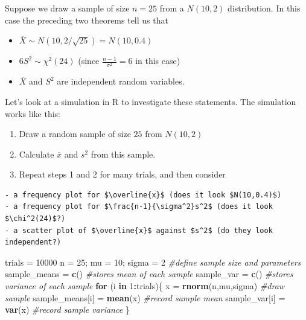 \documentclass[
]{book}
\newenvironment{Shaded}{\begin{snugshade}}{\end{snugshade}}
\newcommand{\CommentTok}[1]{\textcolor[rgb]{0.56,0.35,0.01}{\textit{#1}}}
\newcommand{\ControlFlowTok}[1]{\textcolor[rgb]{0.13,0.29,0.53}{\textbf{#1}}}
\newcommand{\DecValTok}[1]{\textcolor[rgb]{0.00,0.00,0.81}{#1}}
\newcommand{\FunctionTok}[1]{\textcolor[rgb]{0.13,0.29,0.53}{\textbf{#1}}}
\newcommand{\NormalTok}[1]{#1}
\newcommand{\OtherTok}[1]{\textcolor[rgb]{0.56,0.35,0.01}{#1}}
\newcommand{\SpecialCharTok}[1]{\textcolor[rgb]{0.81,0.36,0.00}{\textbf{#1}}}
\providecommand{\tightlist}{%
  \setlength{\itemsep}{0pt}\setlength{\parskip}{0pt}}
\theoremstyle{definition}
\theoremstyle{definition}
\theoremstyle{definition}
\theoremstyle{definition}
\theoremstyle{remark}
\begin{document}
Suppose we draw a sample of size \(n = 25\) from a \(N(10,2)\) distribution. In this case the preceding two theorems tell us that

\begin{itemize}
\tightlist
\item
  \(\overline{X} \sim N(10,2/\sqrt{25}) = N(10,0.4)\)
\item
  \(6 S^2 \sim \chi^2(24)\) (since \(\frac{n-1}{\sigma^2} = 6\) in this case)
\item
  \(\overline{X}\) and \(S^2\) are independent random variables.
\end{itemize}

Let's look at a simulation in R to investigate these statements. The simulation works like this:

\begin{enumerate}
\def\labelenumi{\arabic{enumi}.}
\tightlist
\item
  Draw a random sample of size \(25\) from \(N(10,2)\)
\item
  Calculate \(\overline{x}\) and \(s^2\) from this sample.
\item
  Repeat steps 1 and 2 for many trials, and then consider
\end{enumerate}

\begin{verbatim}
- a frequency plot for $\overline{x}$ (does it look $N(10,0.4)$) 
- a frequency plot for $\frac{n-1}{\sigma^2}s^2$ (does it look $\chi^2(24)$?)
- a scatter plot of $\overline{x}$ against $s^2$ (do they look independent?)
\end{verbatim}

\begin{Shaded}
\begin{Highlighting}[]
\NormalTok{trials }\OtherTok{=} \DecValTok{10000}
\NormalTok{n }\OtherTok{=} \DecValTok{25}\NormalTok{; mu }\OtherTok{=} \DecValTok{10}\NormalTok{; sigma }\OtherTok{=} \DecValTok{2} \CommentTok{\#define sample size and parameters}
\NormalTok{sample\_means }\OtherTok{=} \FunctionTok{c}\NormalTok{() }\CommentTok{\#stores mean of each sample}
\NormalTok{sample\_var }\OtherTok{=} \FunctionTok{c}\NormalTok{() }\CommentTok{\#stores variance of each sample}
\ControlFlowTok{for}\NormalTok{ (i }\ControlFlowTok{in} \DecValTok{1}\SpecialCharTok{:}\NormalTok{trials)\{}
\NormalTok{  x }\OtherTok{=} \FunctionTok{rnorm}\NormalTok{(n,mu,sigma) }\CommentTok{\#draw sample}
\NormalTok{  sample\_means[i] }\OtherTok{=} \FunctionTok{mean}\NormalTok{(x) }\CommentTok{\#record sample mean}
\NormalTok{  sample\_var[i] }\OtherTok{=} \FunctionTok{var}\NormalTok{(x) }\CommentTok{\#record sample variance}
\NormalTok{\}}
\end{Highlighting}
\end{Shaded}
\end{document}
